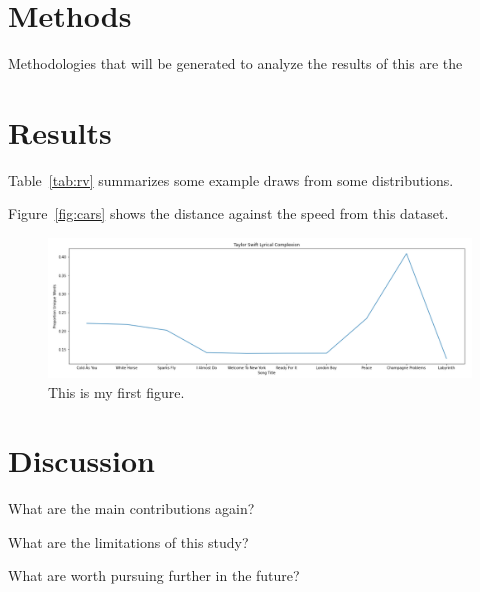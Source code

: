 \documentclass[12pt]{article}
\begin{document}
\section{Methods}
\label{sec:meth}

Methodologies that will be generated to analyze the results of this are the 


\section{Results}
\label{sec:resu}

Table~\ref{tab:rv} summarizes some example draws from some distributions.


Figure~\ref{fig:cars} shows the distance against the speed from this dataset.


\begin{figure}[htbp]
  \centering
  \includegraphics[width=\textwidth]{graph.png}
  \caption{This is my first figure.}
  \label{fig:graph}
\end{figure}

\section{Discussion}
\label{sec:disc}

What are the main contributions again?

What are the limitations of this study?

What are worth pursuing further in the future?





\end{document}
